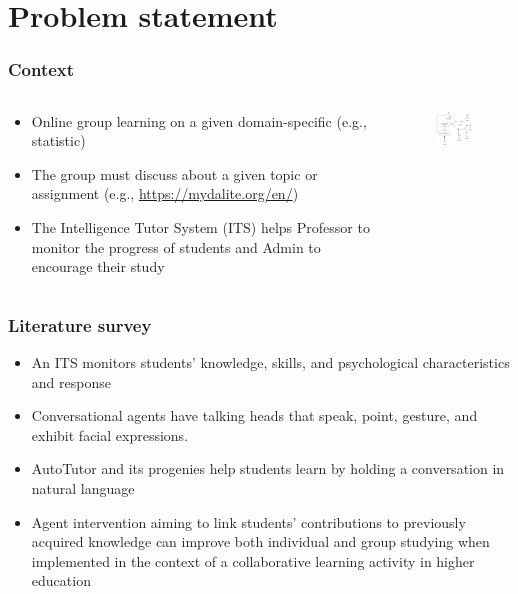 \documentclass{beamer}
\begin{document}
\section{Problem statement} %

\begin{frame}
\frametitle{Context}
\begin{columns}
	\begin{column}{.5\textwidth}
		\begin{itemize}
			\item Online group learning on a given domain-specific (e.g., statistic)
			\item The group must discuss about a given topic or assignment (e.g., \url{https://mydalite.org/en/})
			\item The Intelligence Tutor System (ITS) helps Professor to monitor the progress of students and Admin to encourage their study
		\end{itemize}
	\end{column}
	\begin{column}{.5\textwidth}
\begin{figure}
	\includegraphics[width=45mm]{se1.png}
\end{figure}
\end{column}
\end{columns}

\end{frame}
\begin{frame}
\frametitle{Literature survey}
\begin{itemize}
	\item An ITS monitors  students' knowledge, skills, and psychological
	characteristics  and response \cite{Sottilare}
	\item Conversational agents have talking heads that
	speak, point, gesture, and exhibit facial expressions.
\cite{Johnson2016}
	
	\item AutoTutor and its progenies \cite{Graesser2016} help students learn by holding a conversation in natural language
	\item Agent intervention aiming to link students' contributions to previously acquired knowledge can improve both individual and group studying when implemented in the context of a collaborative learning activity in higher education \cite {Tegos}
\end{itemize}
\end{frame}
\end{document}
